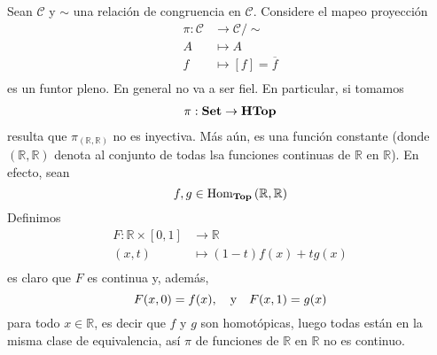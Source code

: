 \documentclass[12pt]{report}
\theoremstyle{largebreak}
\newcommand{\Hom}[3]{\ensuremath{\textup{Hom}_{#1}\left(#2,#3\right)}}
\newcommand{\Cat}[1]{\ensuremath{\textup{\textbf{#1}}}}
\begin{document}
    \begin{exa}
        Sean $\mathcal{C}$ y $\sim$ una relación de congruencia en $\mathcal{C}$. Considere el mapeo proyección
        \begin{equation*}
            \begin{split}
                \pi:\mathcal{C}&\rightarrow\mathcal{C}/\sim\\
                A&\mapsto A\\
                f&\mapsto\left[f\right]=\overline{f}\\
            \end{split}
        \end{equation*}
        es un funtor pleno. En general no va a ser fiel. En particular, si tomamos
        \begin{equation*}
            \begin{split}
                \pi:\Cat{Set}&\rightarrow\Cat{HTop}\\
            \end{split}
        \end{equation*}
        resulta que $\pi_{(\mathbb{R},\mathbb{R})}$ no es inyectiva. Más aún, es una función constante (donde $(\mathbb{R},\mathbb{R})$ denota al conjunto de todas lsa funciones continuas de $\mathbb{R}$ en $\mathbb{R}$). En efecto, sean
        \begin{equation*}
            f,g\in\Hom{\Cat{Top}}{\mathbb{R}}{\mathbb{R}}
        \end{equation*}
        Definimos
        \begin{equation*}
            \begin{split}
                F:\mathbb{R}\times[0,1]&\rightarrow\mathbb{R}\\
                (x,t)&\mapsto (1-t)f(x)+tg(x)\\
            \end{split}
        \end{equation*}
        es claro que $F$ es continua y, además,
        \begin{equation*}
            F(x,0)=f(x),\quad\textup{y}\quad F(x,1)=g(x)
        \end{equation*}
        para todo $x\in\mathbb{R}$, es decir que $f$ y $g$ son homotópicas, luego todas están en la misma clase de equivalencia, así $\pi$ de funciones de $\mathbb{R}$ en $\mathbb{R}$ no es continuo.
    \end{exa}
\end{document}
